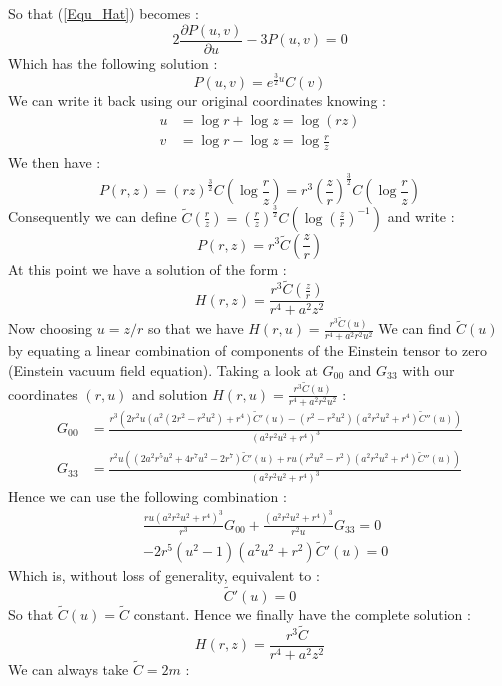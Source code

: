 \documentclass[a4paper,12pt]{article}
\theoremstyle{definition}
\begin{document}
So that (\ref{Equ_Hat}) becomes :
\begin{equation}
	2\frac{\partial P(u,v)}{\partial u}-3P(u,v)=0
\end{equation}
Which has the following solution :
\begin{equation}
	P(u,v)=e^{\frac{3}{2}u}C(v)
\end{equation}
We can write it back using our original coordinates knowing :
\begin{equation}
\begin{split}
	u&=\log{r} + \log{z}=\log{(rz)}\\
	v&=\log{r} - \log{z}=\log{\frac{r}{z}}
\end{split}
\end{equation}
We then have :
\begin{equation}
	P(r,z)=(rz)^\frac{3}{2}C(\log{\frac{r}{z}})=r^3(\frac{z}{r})^\frac{3}{2}C(\log{\frac{r}{z}})
\end{equation}
Consequently we can define $\tilde C(\frac{r}{z})=(\frac{r}{z})^\frac{3}{2}C(\log{(\frac{z}{r})^{-1}})$ and write :
\begin{equation}
	P(r,z)=r^3\tilde C(\frac{z}{r})
\end{equation}
At this point we have a solution of the form :
\begin{equation}
	H(r,z)=\frac{r^3\tilde C(\frac{z}{r})}{r^4+a^2z^2}
\end{equation}
Now choosing $u=z/r$ so that we have $H(r,u)=\frac{r^3\tilde C(u)}{r^4+a^2r^2u^2}$
We can find $\tilde C(u)$ by equating a linear combination of components of the Einstein tensor to zero (Einstein vacuum field equation).
Taking a look at $G_{00}$ and $G_{33}$ with our coordinates $(r,u)$ and solution $H(r,u)=\frac{r^3\tilde C(u)}{r^4+a^2r^2u^2}$ :
\begin{equation}
\begin{split}
	G_{00}&=\frac{r^3 (2 r^2 u (a^2 (2 r^2-r^2
	u^2)+r^4) \tilde C'(u)-(r^2-r^2
	u^2) (a^2 r^2 u^2+r^4)
	\tilde C''(u))}{(a^2 r^2
	u^2+r^4)^3}\\
	G_{33}&=\frac{r^2 u ((2 a^2 r^5
   u^2+4 r^7 u^2-2 r^7)\tilde C'(u)+r u (r^2 u^2-r^2) (a^2
   r^2 u^2+r^4) \tilde C''(u)
   )}{(a^2 r^2 u^2+r^4)^3}
\end{split}
\end{equation}
Hence we can use the following combination :
\begin{equation}
\begin{split}
	&\frac{ru(a^2 r^2 u^2+r^4)^3}{r^3}G_{00}+\frac{(a^2 r^2 u^2+r^4)^3}{r^2u}G_{33}=0\\
	&-2 r^5 (u^2-1) (a^2 u^2+r^2)\tilde C'(u)=0
\end{split}
\end{equation}
Which is, without loss of generality, equivalent to :
\begin{equation}
	\tilde C'(u)=0
\end{equation}
So that $\tilde C(u)=\tilde C$ constant. Hence we finally have the complete solution :
\begin{equation}
	H(r,z)=\frac{r^3\tilde C}{r^4+a^2z^2}
\end{equation}
We can always take $\tilde C=2m$ :
\end{document}
